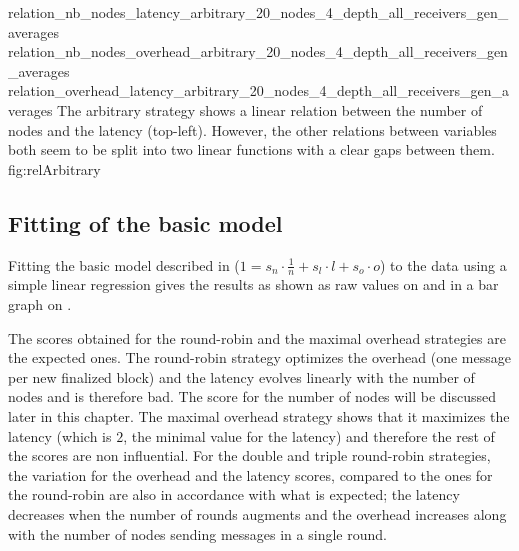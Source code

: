\triplefigure
    {relation_nb_nodes_latency_arbitrary_20_nodes_4_depth_all_receivers_gen_averages}
    {relation_nb_nodes_overhead_arbitrary_20_nodes_4_depth_all_receivers_gen_averages}
    {relation_overhead_latency_arbitrary_20_nodes_4_depth_all_receivers_gen_averages}
    {The arbitrary strategy shows a linear relation between the number of
    nodes and the latency (top-left). However, the other relations between
    variables both seem to be split into two linear functions with a clear gaps
    between them.}
    {fig:relArbitrary}

\FloatBarrier
\subsection{Fitting of the basic model}
Fitting the basic model described in  (\(1 = s_n
\cdot \frac{1}{n} + s_l\cdot l + s_o\cdot o\)) to the data using a simple linear
regression gives the results as shown as raw values on
 and in a bar graph on
.

\begin{table}
\end{table}

The scores obtained for the round-robin and the maximal overhead strategies are
the expected ones. The round-robin strategy optimizes the overhead (one message
per new finalized block) and the latency evolves linearly with the number of
nodes and is therefore bad. The score for the number of nodes will be discussed
later in this chapter. The maximal overhead strategy shows that it maximizes the
latency (which is \(2\), the minimal value for the latency) and therefore the
rest of the scores are non influential.
For the double and triple round-robin strategies, the variation for the overhead
and the latency scores, compared to the ones for the round-robin are also in
accordance with what is expected; the latency decreases when the number of
rounds augments and the overhead increases along with the number of nodes
sending messages in a single round.

